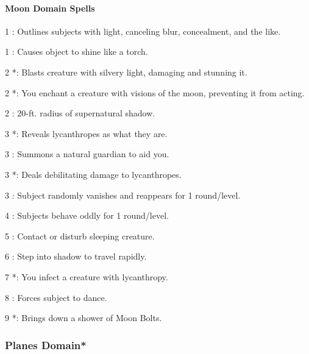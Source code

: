 \paragraph{Moon Domain Spells}
\begin{list}{}{\leftmargin=1em}
 \item[1] : Outlines subjects with light, canceling blur, concealment, and the like.
 \item[1] : Causes object to shine like a torch.
 \item[2] *: Blasts creature with silvery light, damaging and stunning it.
 \item[2] *: You enchant a creature with visions of the moon, preventing it from acting.
 \item[2] : 20-ft. radius of supernatural shadow.
 \item[3] *: Reveals lycanthropes as what they are.
 \item[3] : Summons a natural guardian to aid you.
 \item[3] *: Deals debilitating damage to lycanthropes.
 \item[3] : Subject randomly vanishes and reappears for 1 round/level.
 \item[4] : Subjects behave oddly for 1 round/level.
 \item[5] : Contact or disturb sleeping creature.
 \item[6] : Step into shadow to travel rapidly.
 \item[7] *: You infect a creature with lycanthropy.
 \item[8] : Forces subject to dance.
 \item[9] *: Brings down a shower of Moon Bolts.
\end{list}
\subsubsection[Planes Domain]{Planes Domain*}
